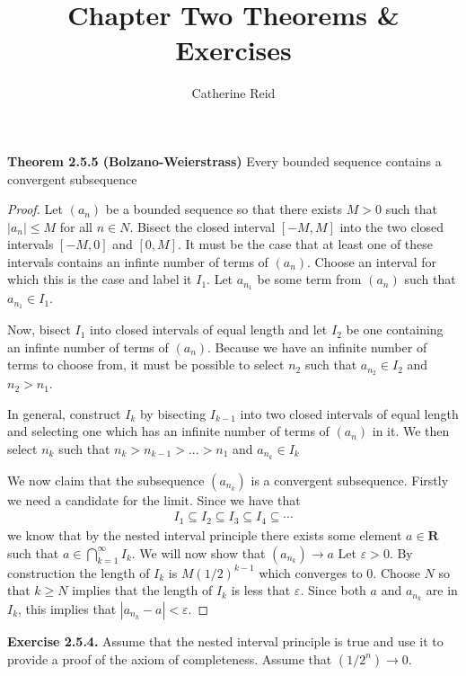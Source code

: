 \documentclass{article}
\author{Catherine Reid}
\title{Chapter Two Theorems \& Exercises}
\begin{document}
\maketitle

\textbf{Theorem 2.5.5 (Bolzano-Weierstrass)} Every bounded sequence contains a convergent subsequence
\begin{proof}
    Let $(a_n)$ be a bounded sequence so that there exists $M > 0$ such that $|a_n| \le M$ for all $n \in N$. Bisect
    the closed interval $[-M, M]$ into the two closed intervals $[-M, 0]$ and $[0, M]$. It must be the case that at least one of
    these intervals contains an infinte number of terms of $(a_n)$. Choose an interval for which this is the case and label it $I_1$.
    Let $a_{n_1}$ be some term from $(a_n)$ such that $a_{n_1} \in I_1$.

    Now, bisect $I_1$ into closed intervals of equal length and let $I_2$ be one containing an infinte number of terms
    of $(a_n)$. Because we have an infinite number of terms to choose from, it must be possible to select $n_2$ such that
    $a_{n_2} \in I_2$ and $n_2 > n_1$.

    In general, construct $I_{k}$ by bisecting $I_{k-1}$ into two closed intervals of equal length and selecting one which
    has an infinite number of terms of $(a_n)$ in it. We then select $n_k$ such that $n_k > n_{k-1} > ... > n_1$ and $a_{n_k} \in I_k$

    We now claim that the subsequence $(a_{n_k})$ is a convergent subsequence. Firstly we need a candidate for the limit. Since we have that
    \begin{align*}
        I_1 \subseteq  I_2 \subseteq I_3 \subseteq  I_4 \subseteq \cdots
    \end{align*}
    we know that by the nested interval principle there exists some element $a \in \mathbf{R}$ such that $a \in {\bigcap}_{k=1}^\infty I_k$.
    We will now show that $(a_{n_k}) \to a$
    Let $\varepsilon > 0$. By construction the length of $I_k$ is $M(1/2)^{k-1}$ which converges to 0. Choose $N$ so that
    $k \ge N$ implies that the length of $I_k$ is less that $\varepsilon$. Since both $a$ and $a_{n_k}$ are in $I_k$, this implies
    that $|a_{n_k} - a| < \varepsilon$.
\end{proof}
\pagebreak

\textbf{Exercise 2.5.4.} Assume that the nested interval principle is true and use it to provide a proof of the axiom of completeness.
Assume that $(1/2^n) \to 0$.
\end{document}
